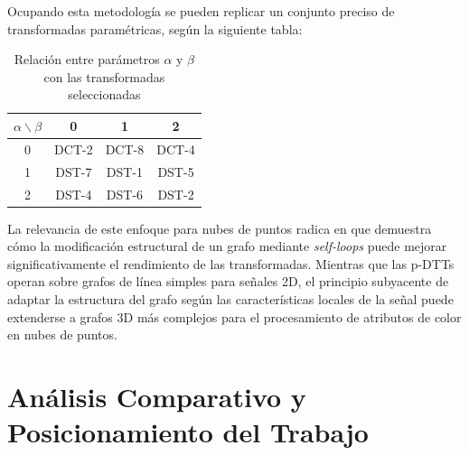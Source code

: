 Ocupando esta metodología se pueden replicar un conjunto preciso de transformadas
paramétricas, según la siguiente tabla:

\begin{table}[H]
    \centering
    \caption{Relación entre parámetros $\alpha$ y $\beta$ con las transformadas seleccionadas}
    \begin{tabular}{c|ccc}
    \toprule
    $\alpha \backslash \beta$ & 0 & 1 & 2 \\
    \midrule
    0 & DCT-2 & DCT-8 & DCT-4 \\
    1 & DST-7 & DST-1 & DST-5 \\
    2 & DST-4 & DST-6 & DST-2 \\
    \bottomrule
    \end{tabular}
\end{table}

La relevancia de este enfoque para nubes de puntos radica en que demuestra cómo la
modificación estructural de un grafo mediante \textit{self-loops} puede mejorar
significativamente el rendimiento de las transformadas. Mientras que las p-DTTs operan
sobre grafos de línea simples para señales 2D, el principio subyacente de adaptar la
estructura del grafo según las características locales de la señal puede extenderse a
grafos 3D más complejos para el procesamiento de atributos de color en nubes de puntos.


\section{Análisis Comparativo y Posicionamiento del Trabajo}

